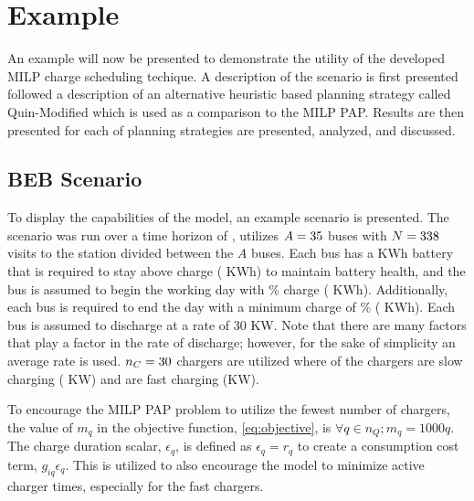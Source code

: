 
%
\section{Example}
\label{sec:example}

An example will now be presented to demonstrate the utility of the developed MILP charge scheduling techique. A
description of the scenario is first presented followed a description of an alternative heuristic based planning
strategy called Quin-Modified which is used as a comparison to the MILP PAP. Results are then presented for each of
planning strategies are presented, analyzed, and discussed.

%
\subsection{BEB Scenario}

To display the capabilities of the model, an example scenario is presented. The scenario was run over a time horizon of
, utilizes $A = 35$ buses with $N = 338$ visits to the station divided between the $A$ buses. Each bus has a
\batsize KWh battery that is required to stay above \mincharge charge (\fpeval{\batsize * \minchargeD} KWh) to
maintain battery health, and the bus is assumed to begin the working day with \% charge
(\fpeval{\acharge * \batsize} KWh). Additionally, each bus is required to end the day with a minimum charge of
\% (\fpeval{\bcharge * \batsize} KWh). Each bus is assumed to discharge at a rate of 30 KW. Note
that there are many factors that play a factor in the rate of discharge; however, for the sake of simplicity an average
rate is used. $n_C = \fpeval{\fast + \slow}$ chargers are utilized where \slow of the chargers are slow charging (\slows
KW) and \fast are fast charging (\fasts KW).

To encourage the MILP PAP problem to utilize the fewest number of chargers, the value of $m_q$ in the objective
function, \eqref{eq:objective}, is $\forall q \in n_Q; m_q = 1000q$. The charge duration scalar, $\epsilon_q$, is defined as $\epsilon_q = r_q$
to create a consumption cost term, $g_{iq}\epsilon_q$. This is utilized to also encourage the model to minimize active charger
times, especially for the fast chargers.

